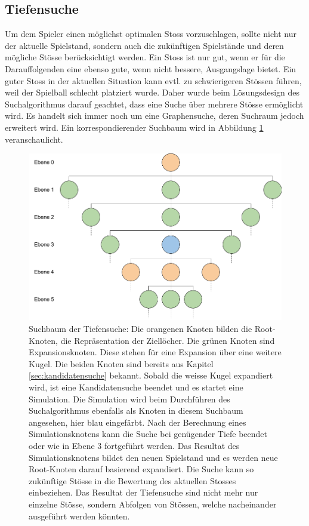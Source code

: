 \subsection{Tiefensuche}
Um dem Spieler einen möglichst optimalen Stoss vorzuschlagen, sollte nicht nur der aktuelle Spielstand,
sondern auch die zukünftigen Spielstände und deren mögliche Stösse berücksichtigt werden.
Ein Stoss ist nur gut, wenn er für die Darauffolgenden eine ebenso gute, wenn nicht bessere, Ausgangslage bietet.
Ein guter Stoss in der aktuellen Situation kann evtl. zu schwierigeren Stössen führen, weil der Spielball schlecht platziert wurde.
Daher wurde beim Lösungsdesign des Suchalgorithmus darauf geachtet, dass eine Suche über mehrere Stösse ermöglicht wird.
Es handelt sich immer noch um eine Graphensuche, deren Suchraum jedoch erweitert wird.
Ein korrespondierender Suchbaum wird in Abbildung \ref{fig:suchbaum_tiefensuche} veranschaulicht.

\begin{figure}[h!]
    \begin{center}
        \includegraphics[width=0.7\linewidth]{../common/03_billiard_ai/resources/38_tiefensuche_suchbaum.png}
    \end{center}
    \caption{Suchbaum der Tiefensuche: Die orangenen Knoten bilden die Root-Knoten, die Repräsentation der Ziellöcher. Die grünen Knoten sind
    Expansionsknoten. Diese stehen für eine Expansion über eine weitere Kugel. Die beiden Knoten sind bereits aus
    Kapitel \ref{sec:kandidatensuche} bekannt. Sobald die weisse Kugel expandiert wird, ist eine Kandidatensuche beendet und
    es startet eine Simulation. Die Simulation wird beim Durchführen des Suchalgorithmus ebenfalls als Knoten in diesem
    Suchbaum angesehen, hier blau eingefärbt. Nach der Berechnung eines Simulationsknotens kann die Suche bei genügender
    Tiefe beendet oder wie in Ebene 3 fortgeführt werden. Das Resultat des Simulationsknotens bildet den neuen Spielstand
    und es werden neue Root-Knoten darauf basierend expandiert. Die Suche kann so zukünftige Stösse in die Bewertung
    des aktuellen Stosses einbeziehen.
    Das Resultat der Tiefensuche sind nicht mehr nur einzelne Stösse, sondern Abfolgen von Stössen, welche nacheinander
    ausgeführt werden könnten.}
    \label{fig:suchbaum_tiefensuche}
\end{figure}

